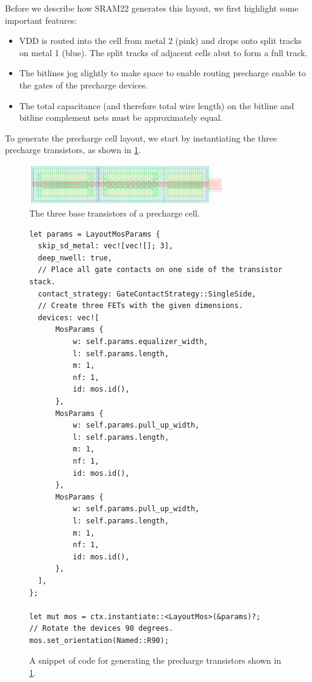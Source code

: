 Before we describe how SRAM22 generates this layout, we first highlight some important features:
\begin{itemize}
\item VDD is routed into the cell from metal 2 (pink) and drops onto split tracks on metal 1 (blue).
  The split tracks of adjacent cells abut to form a full track.
\item The bitlines jog slightly to make space to enable routing precharge enable to the gates of the precharge devices.
\item The total capacitance (and therefore total wire length) on the bitline and bitline complement nets must be approximately equal.
\end{itemize}

To generate the precharge cell layout, we start by instantiating the three precharge transistors, as shown in \ref{fig:precharge-transistors}.

\begin{figure}[H] \centering
\includegraphics[width=0.75\textwidth]{figures/precharge_transistors.png}
\caption{The three base transistors of a precharge cell. \label{fig:precharge-transistors}}
\end{figure}

\begin{figure}[H] \centering
\begin{verbatim}
let params = LayoutMosParams {
  skip_sd_metal: vec![vec![]; 3],
  deep_nwell: true,
  // Place all gate contacts on one side of the transistor stack.
  contact_strategy: GateContactStrategy::SingleSide,
  // Create three FETs with the given dimensions.
  devices: vec![
      MosParams {
          w: self.params.equalizer_width,
          l: self.params.length,
          m: 1,
          nf: 1,
          id: mos.id(),
      },
      MosParams {
          w: self.params.pull_up_width,
          l: self.params.length,
          m: 1,
          nf: 1,
          id: mos.id(),
      },
      MosParams {
          w: self.params.pull_up_width,
          l: self.params.length,
          m: 1,
          nf: 1,
          id: mos.id(),
      },
  ],
};

let mut mos = ctx.instantiate::<LayoutMos>(&params)?;
// Rotate the devices 90 degrees.
mos.set_orientation(Named::R90);
\end{verbatim}
\caption{A snippet of code for generating the precharge transistors shown in \ref{fig:precharge-transistors}. \label{fig:precharge-transistors-code}}
\end{figure}

